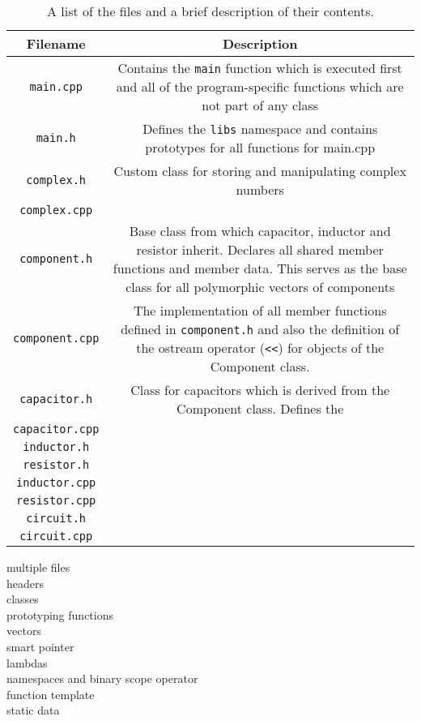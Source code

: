 \begin{table}[h!]
    \begin{tabular}{|c|c|}
      \hline
      Filename & Description \\
      \hline
      \hline
      \verb!main.cpp! & Contains the \verb!main! function which is executed first and all of the program-specific functions which are not part of any class \\
      \hline
      \verb!main.h! & Defines the \verb!libs! namespace and contains prototypes for all functions for main.cpp \\
      \hline
      \verb!complex.h! & Custom class for storing and manipulating complex numbers \\
      \hline
      \verb!complex.cpp! & \\
      \hline
      \verb!component.h! & Base class from which capacitor, inductor and resistor inherit. Declares all shared member functions and member data. This serves as the base class for all polymorphic vectors of components\\
      \hline
      \verb!component.cpp! & The implementation of all member functions defined in \verb!component.h! and also the definition of the ostream operator (\verb!<<!) for objects of the Component class. \\
      \hline
      \verb!capacitor.h! & Class for capacitors which is derived from the Component class. Defines the \\
      \hline
      \verb!capacitor.cpp! & \\
      \hline
      \verb!inductor.h! & \\
      \hline
      \verb!resistor.h! & \\
      \hline
      \verb!inductor.cpp! & \\
      \hline
      \verb!resistor.cpp! & \\
      \hline
      \verb!circuit.h! & \\
      \hline
      \verb!circuit.cpp! & \\
      \hline
    \end{tabular}
  \caption{A list of the files and a brief description of their contents.}
  \label{table:files}
\end{table}



multiple files\\
headers\\

classes\\
prototyping functions\\

vectors\\
smart pointer\\
lambdas\\
namespaces and binary scope operator\\
function template\\
static data\\
